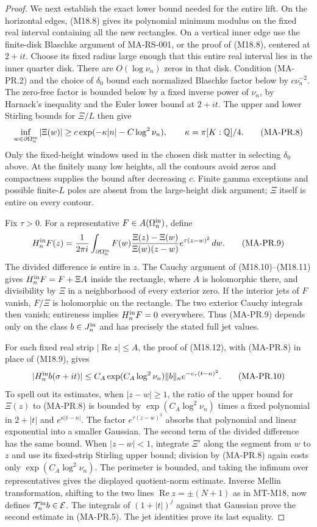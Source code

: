 \begin{proof}
We next establish the exact lower bound needed for the
entire lift.  On the horizontal edges, (M18.8) gives its
polynomial minimum modulus on the fixed real interval
containing all the new rectangles.  On a vertical inner
edge use the finite-disk Blaschke argument of MA-RS-001,
or the proof of (M18.8), centered at $2+it$.
Choose its fixed radius large enough that this entire
real interval lies in the inner quarter disk.
There are $O(\log\nu_n)$ zeros in that disk.
Condition (MA-PR.2) and the choice of $\delta_0$ bound
each normalized Blaschke factor below by
$c\nu_n^{-2}$.  The zero-free factor is bounded below
by a fixed inverse power of $\nu_n$, by Harnack's
inequality and the Euler lower bound at $2+it$.
The upper and lower Stirling bounds for $\Xi/L$ then give
\[
 \inf_{w\in\partial\Omega_n^{\rm in}}|\Xi(w)|
       \ge c\exp(-\kappa|n|-C\log^2\nu_n),
       \qquad \kappa=\pi[K:\mathbb Q]/4.
\tag{MA-PR.8}
\]
Only the fixed-height windows used in the chosen disk
matter in selecting $\delta_0$ above.  At the finitely
many low heights, all the contours avoid zeros and
compactness supplies the bound after decreasing $c$.
Finite gamma exceptions and possible finite-$L$ poles
are absent from the large-height disk argument;
$\Xi$ itself is entire on every contour.

Fix $\tau>0$.  For a representative
$F\in A(\Omega_n^{\rm in})$, define
\[
 H_n^{\rm in}F(z)
   =\frac1{2\pi i}\int_{\partial\Omega_n^{\rm in}}
      F(w)\frac{\Xi(z)-\Xi(w)}{\Xi(w)(z-w)}
                         e^{\tau(z-w)^2}\,dw .
\tag{MA-PR.9}
\]
The divided difference is entire in $z$.
The Cauchy argument of (M18.10)--(M18.11) gives
$H_n^{\rm in}F=F+\Xi A$ inside the rectangle,
where $A$ is holomorphic there, and divisibility by
$\Xi$ in a neighborhood of every exterior zero.
If the interior jets of $F$ vanish, $F/\Xi$ is
holomorphic on the rectangle.  The two exterior
Cauchy integrals then vanish; entireness implies
$H_n^{\rm in}F=0$ everywhere.
Thus (MA-PR.9) depends only on the class $b\in J_n^{\rm in}$
and has precisely the stated full jet values.

For each fixed real strip $|\operatorname{Re}z|\le A$,
the proof of (M18.12), with (MA-PR.8) in place of
(M18.9), gives
\[
 |H_n^{\rm in}b(\sigma+it)|
    \le C_A\exp(C_A\log^2\nu_n)\|b\|_n
                                   e^{-c_\tau(t-n)^2}.
\tag{MA-PR.10}
\]
To spell out its estimates, when $|z-w|\ge1$, the
ratio of the upper bound for $\Xi(z)$ to (MA-PR.8)
is bounded by $\exp(C_A\log^2\nu_n)$ times a fixed
polynomial in $2+|t|$ and $e^{\kappa|t-n|}$.
The factor $e^{\tau(z-w)^2}$ absorbs that polynomial
and linear exponential into a smaller Gaussian.
The second term of the divided difference has the
same bound.  When $|z-w|<1$, integrate $\Xi'$ along
the segment from $w$ to $z$ and use its fixed-strip
Stirling upper bound; division by (MA-PR.8) again
costs only $\exp(C_A\log^2\nu_n)$.
The perimeter is bounded, and taking the infimum over
representatives gives the displayed quotient-norm estimate.
Inverse Mellin transformation, shifting to the two
lines $\operatorname{Re}z=\pm(N+1)$ as in MT-M18,
now defines $\mathcal T_n^{\rm in}b\in\mathcal E$.
The integrals of $(1+|t|)^j$ against that Gaussian
prove the second estimate in (MA-PR.5).
The jet identities prove its last equality.


\end{proof}
